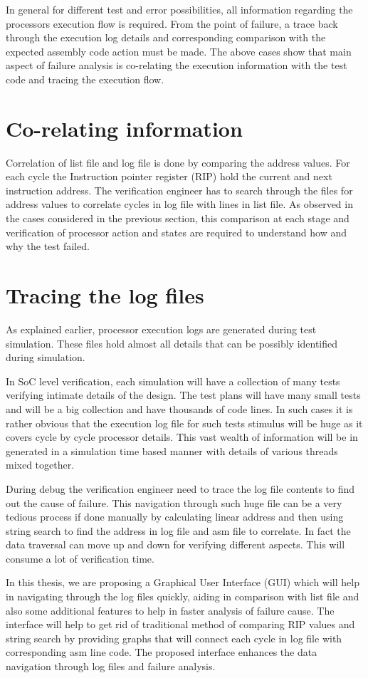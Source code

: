 In general for different test and error possibilities, all information regarding the processors execution flow is required. From the point of failure, a trace back through the execution log details and corresponding comparison with the expected assembly code action must be made. 
The above cases show that main aspect of failure analysis is co-relating the execution information with the test code and tracing the execution flow. 

\section{Co-relating information}

Correlation of list file and log file is done by comparing the address values. For each cycle the Instruction pointer register (RIP) hold the current and next instruction address. The verification engineer has to search through the files for address values to correlate cycles in log file with lines in list file. As observed in the cases considered in the previous section, this comparison at each stage and verification of processor action and states are required to understand how and why the test failed.

\section{Tracing the log files}
 
As explained earlier, processor execution logs are generated during test simulation. These files hold almost all details that can be possibly identified during simulation. 

In SoC level verification, each simulation will have a collection of many tests verifying intimate details of the design. The test plans will have many small tests and will be a big collection and have thousands of code lines. 
In such cases it is rather obvious that the execution log file for such tests stimulus will be huge as it covers cycle by cycle processor details.  This vast wealth of information will be in generated in a simulation time based manner with details of various threads mixed together. 

During debug the verification engineer need to trace the log file contents to find out the cause of failure. This navigation through such huge file can be a very tedious process if done manually by calculating linear address and then using string search to find the address in log file and asm file to correlate.  In fact the data traversal can move up and down for verifying different aspects. This will consume a lot of verification time. 

In this thesis, we are proposing a Graphical User Interface (GUI) which will help in navigating through the log files quickly, aiding in comparison with list file and also some additional features to help in faster analysis of failure cause. The interface will help to get rid of traditional method of comparing RIP values and string search by providing graphs that will connect each cycle in log file with corresponding asm line code. The proposed interface enhances the data navigation through log files and failure analysis. 


